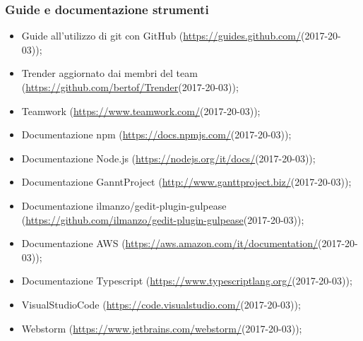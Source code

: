 \documentclass[../NormeDiProgetto_v3.0.0.tex]{subfiles}
\begin{document}
    \subsubsection{Guide e documentazione strumenti}
    \begin{itemize}
        \item Guide all'utilizzo di git con GitHub (\url{https://guides.github.com/}(2017-20-03));
        \item Trender aggiornato dai membri del team (\url{https://github.com/bertof/Trender}(2017-20-03));
        \item Teamwork (\url{https://www.teamwork.com/}(2017-20-03));
        \item Documentazione npm (\url{https://docs.npmjs.com/}(2017-20-03));
        \item Documentazione Node.js (\url{https://nodejs.org/it/docs/}(2017-20-03));
        \item Documentazione GanntProject (\url{http://www.ganttproject.biz/}(2017-20-03));
        \item Documentazione ilmanzo/gedit-plugin-gulpease \\(\url{https://github.com/ilmanzo/gedit-plugin-gulpease}(2017-20-03));
        \item Documentazione AWS (\url{https://aws.amazon.com/it/documentation/}(2017-20-03));
        \item Documentazione Typescript (\url{https://www.typescriptlang.org/}(2017-20-03));
        \item VisualStudioCode (\url{https://code.visualstudio.com/}(2017-20-03));
        \item Webstorm (\url{https://www.jetbrains.com/webstorm/}(2017-20-03));
    \end{itemize}
\end{document}
